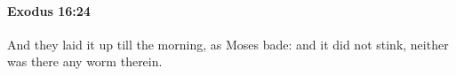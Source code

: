 
		\paragraph{Exodus 16:24} %
			\label{EXODUS-16-24}

			And they laid it up till the morning, as Moses bade: and it did not stink, neither was there any worm therein.



